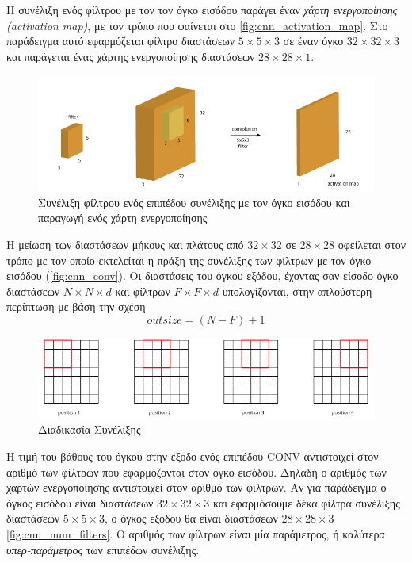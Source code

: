 Η συνέλιξη ενός φίλτρου με τον τον όγκο εισόδου παράγει έναν \emph{χάρτη ενεργοποίησης (activation map)},
με τον τρόπο που φαίνεται στο \autoref{fig:cnn_activation_map}. Στο παράδειγμα αυτό
εφαρμόζεται φίλτρο διαστάσεων $5\times5\times3$ σε έναν όγκο $32 \times 32 \times 3$ και παράγεται
ένας χάρτης ενεργοποίησης διαστάσεων $28\times28\times1$.

\begin{figure}[!ht]
  \centering
  \includegraphics[width=1\textwidth]{./images/chapter3/cnn_activation_map.png}
  \caption[Συνέλιξη φίλτρου ενός επιπέδου συνέλιξης με τον όγκο εισόδου και παραγωγή ενός χάρτη ενεργοποίησης]{Συνέλιξη φίλτρου ενός επιπέδου συνέλιξης με τον όγκο εισόδου και παραγωγή ενός χάρτη ενεργοποίησης}
  \label{fig:cnn_activation_map}
\end{figure}

Η μείωση των διαστάσεων μήκους και πλάτους από $32 \times 32$ σε $28 \times 28$ οφείλεται στον τρόπο με τον οποίο
εκτελείται η πράξη της συνέλιξης των φίλτρων με τον όγκο εισόδου  (\autoref{fig:cnn_conv}).
Οι διαστάσεις του όγκου εξόδου, έχοντας σαν είσοδο όγκο διαστάσεων $N \times N \times d$ και φίλτρων $F \times F \times d$ υπολογίζονται, στην απλούστερη περίπτωση με βάση την σχέση
\begin{equation*}
  outsize = (N-F) + 1
\end{equation*}


\begin{figure}[!ht]
  \centering
  \includegraphics[width=1\textwidth]{./images/chapter3/cnn_conv.png}
  \caption[Διαδικασία Συνέλιξης]{Διαδικασία Συνέλιξης}
  \label{fig:cnn_conv}
\end{figure}

Η τιμή του βάθους του όγκου στην έξοδο ενός επιπέδου CONV αντιστοιχεί στον αριθμό των φίλτρων που
εφαρμόζονται στον όγκο εισόδου. Δηλαδή ο αριθμός των χαρτών ενεργοποίησης
αντιστοιχεί στον αριθμό των φίλτρων. Αν για παράδειγμα ο όγκος εισόδου είναι
διαστάσεων $32 \times 32 \times 3$ και εφαρμόσουμε δέκα φίλτρα συνέλιξης διαστάσεων $5\times5\times3$,
ο όγκος εξόδου θα είναι διαστάσεων $28\times28\times3$ \autoref{fig:cnn_num_filters}.
Ο αριθμός των φίλτρων είναι μία παράμετρος, ή καλύτερα \emph{υπερ-παράμετρος} των επιπέδων συνέλιξης.

